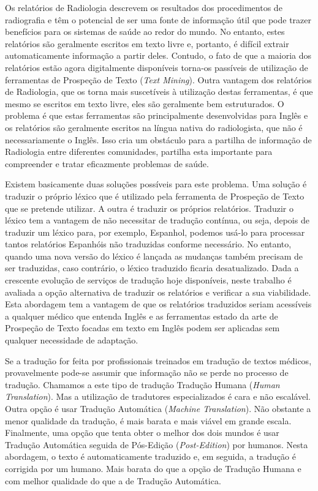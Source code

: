 \begin{abstractspt}
	
Os relatórios de Radiologia descrevem os resultados dos procedimentos de radiografia e têm o potencial de ser uma fonte de informação útil que pode trazer benefícios para os sistemas de saúde ao redor do mundo. No entanto, estes relatórios são geralmente escritos em texto livre e, portanto, é difícil extrair automaticamente informação a partir deles. Contudo, o fato de que a maioria dos relatórios estão agora digitalmente disponíveis torna-os passíveis de utilização de ferramentas de Prospeção de Texto (\textit{Text Mining}). Outra vantagem dos relatórios de Radiologia, que os torna mais suscetíveis à utilização destas ferramentas, é que mesmo se escritos em texto livre, eles são geralmente bem estruturados. O problema é que estas ferramentas são principalmente desenvolvidas para Inglês e os relatórios são geralmente escritos na língua nativa do radiologista, que não é necessariamente o Inglês. Isso cria um obstáculo para a partilha de informação de Radiologia entre diferentes comunidades, partilha esta importante para compreender e tratar eficazmente problemas de saúde.

Existem basicamente duas soluções possíveis para este problema. Uma solução é traduzir o próprio léxico que é utilizado pela ferramenta de Prospeção de Texto que se pretende utilizar. A outra é traduzir os próprios relatórios. Traduzir o léxico tem a vantagem de não necessitar de tradução contínua, ou seja, depois de traduzir um léxico para, por exemplo, Espanhol, podemos usá-lo para processar tantos relatórios Espanhóis não traduzidas conforme necessário. No entanto, quando uma nova versão do léxico é lançada as mudanças também precisam de ser traduzidas, caso contrário, o léxico traduzido ficaria desatualizado. Dada a crescente evolução de serviços de tradução hoje disponíveis, neste trabalho é avaliada a opção alternativa de traduzir os relatórios e verificar a sua viabilidade. Esta abordagem tem a vantagem de que os relatórios traduzidos seriam acessíveis a qualquer médico que entenda Inglês e as ferramentas estado da arte de Prospeção de Texto focadas em texto em Inglês podem ser aplicadas sem qualquer necessidade de adaptação.

Se a tradução for feita por profissionais treinados em tradução de textos médicos, provavelmente pode-se assumir que informação não se perde no processo de tradução. Chamamos a este tipo de tradução Tradução Humana (\textit{Human Translation}). Mas a utilização de tradutores especializados é cara e não escalável. Outra opção é usar Tradução Automática (\textit{Machine Translation}). Não obstante a menor qualidade da tradução, é mais barata e mais viável em grande escala. Finalmente, uma opção que tenta obter o melhor dos dois mundos é usar Tradução Automática seguida de Pós-Edição (\textit{Post-Edition}) por humanos. Nesta abordagem, o texto é automaticamente traduzido e, em seguida, a tradução é corrigida por um humano. Mais barata do que a opção de Tradução Humana e com melhor qualidade do que a de Tradução Automática.


\end{abstractspt}
